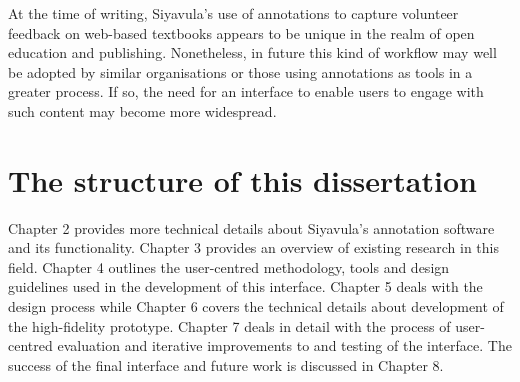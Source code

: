 At the time of writing, Siyavula's use of annotations to capture volunteer feedback on web-based textbooks appears to be unique in the realm of open education and publishing. Nonetheless, in future this kind of workflow may well be adopted by similar organisations or those using annotations as tools in a greater process. If so, the need for an interface to enable users to engage with such content may become more widespread. 


\section{The structure of this dissertation}

Chapter 2 provides more technical details about Siyavula's annotation software and its functionality. Chapter 3 provides an overview of existing research in this field. Chapter 4 outlines the user-centred methodology, tools and design guidelines used in the development of this interface. Chapter 5 deals with the design process while Chapter 6 covers the technical details about development of the high-fidelity prototype. Chapter 7 deals in detail with the process of user-centred evaluation and iterative improvements to and testing of the interface. The success of the final interface and future work is discussed in Chapter 8.   
